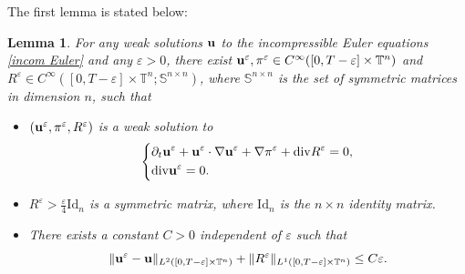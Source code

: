 \documentclass[12pt,reqno]{amsart}
\newtheorem{Lemma}{Lemma}[section]
\theoremstyle{definition}
\theoremstyle{remark}
\numberwithin{equation}{section}
\renewcommand{\u}{{\bf u}}
\newcommand{\Dv}{{\rm div}}
\newcommand{\id}{\mathrm{Id}}
\newcommand{\eps}{{\varepsilon}}
\begin{document}
The first lemma is stated below:
\begin{Lemma}
\label{incom smooth} 
For any weak solutions $\u$ to the incompressible Euler equations  \eqref{incom Euler} and any $\eps > 0$,
there exist $\u^{\varepsilon}, \pi^\varepsilon \in C^{\infty}([0,T-\eps] \times \mathbb{T}^n)$ and $R^\varepsilon \in C^\infty([0, T - \varepsilon] \times \mathbb{T}^n; \mathbb{S}^{n \times n})$, where $\mathbb{S}^{n \times n}$ is the set of symmetric matrices in dimension $n$,  such that
\begin{itemize}
\item
$(\u^{\varepsilon}, \pi^{\varepsilon}, R^\varepsilon)$ is a weak solution to 
\begin{equation}
\label{smooth euler}
\left\{
\begin{split}
& \partial_t \u^{\varepsilon} + \u^{\varepsilon}\cdot\nabla \u^{\varepsilon}+\nabla \pi^{\varepsilon}+\Dv R^{\varepsilon}=0,
\\& \Dv {\u^{\varepsilon}}=0.
\end{split}
\right.
\end{equation}
\item $R^{\varepsilon}>\frac{\varepsilon}{4} \id_n$ is a symmetric matrix, where $\id_n$ is the $n \times n$ identity matrix.
\item There exists a constant $C>0$ independent of $\eps$ such that
\begin{equation}\label{eq reg est}
\|\u^{\varepsilon}-\u\|_{L^2([0,T - \eps] \times \mathbb{T}^n)}+\|R^{\varepsilon}\|_{L^1([0,T - \eps] \times \mathbb{T}^n)}\leq C \varepsilon.
\end{equation}
\end{itemize}
\end{Lemma}
\end{document}
